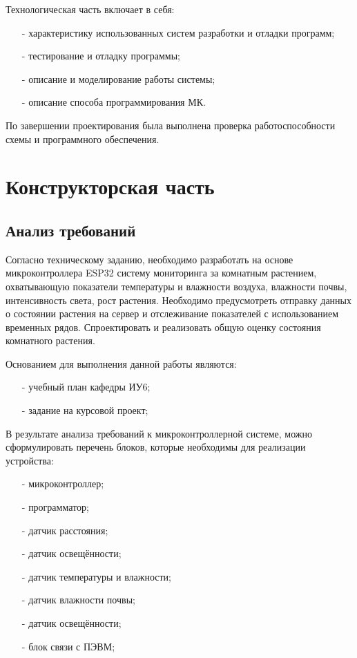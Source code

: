 \documentclass{bmstu}
\begin{document}
    Технологическая часть включает в себя:
    \begin{itemize}
        \item[-] характеристику использованных систем разработки и отладки программ;
        \item[-] тестирование и отладку программы;
        \item[-] описание и моделирование работы системы;
        \item[-] описание способа программирования МК.
    \end{itemize}

    По завершении проектирования была выполнена проверка работоспособности схемы и программного обеспечения.


    \chapter{Конструкторская часть}
    \section{Анализ требований}
    Согласно техническому заданию, необходимо разработать на основе микроконтроллера ESP32 систему мониторинга за комнатным растением, охватывающую показатели температуры и влажности воздуха, влажности почвы, интенсивность света, рост растения. Необходимо предусмотреть  отправку данных о состоянии растения на сервер и отслеживание показателей с использованием временных рядов. Спроектировать и реализовать общую оценку состояния комнатного растения.

    Основанием для выполнения данной работы являются:
    \begin{itemize}
        \item[-] учебный план кафедры ИУ6;
        \item[-] задание на курсовой проект;
    \end{itemize}

    В результате анализа требований к микроконтроллерной системе, можно сформулировать перечень блоков, которые необходимы для реализации устройства:
    \begin{itemize}
        \item[-] микроконтроллер;
        \item[-] программатор;
        \item[-] датчик расстояния;
        \item[-] датчик освещённости;
        \item[-] датчик температуры и влажности;
        \item[-] датчик влажности почвы;
        \item[-] датчик освещённости;
        \item[-] блок связи с ПЭВМ;
    \end{itemize}
\end{document}
